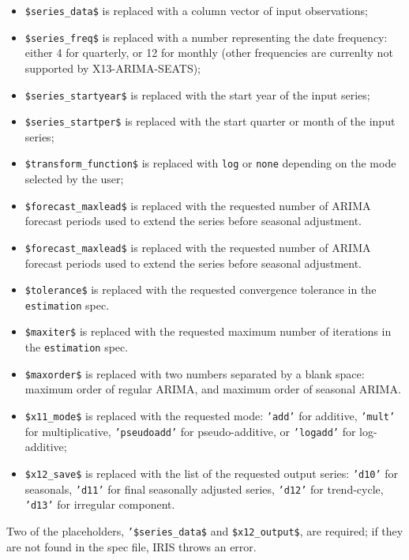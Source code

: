 \begin{itemize}
\itemsep1pt\parskip0pt
\item
  \texttt{\$series\_data\$} is replaced with a column vector of input
  observations;
\item
  \texttt{\$series\_freq\$} is replaced with a number representing the
  date frequency: either 4 for quarterly, or 12 for monthly (other
  frequencies are currenlty not supported by X13-ARIMA-SEATS);
\item
  \texttt{\$series\_startyear\$} is replaced with the start year of the
  input series;
\item
  \texttt{\$series\_startper\$} is replaced with the start quarter or
  month of the input series;
\item
  \texttt{\$transform\_function\$} is replaced with \texttt{log} or
  \texttt{none} depending on the mode selected by the user;
\item
  \texttt{\$forecast\_maxlead\$} is replaced with the requested number
  of ARIMA forecast periods used to extend the series before seasonal
  adjustment.
\item
  \texttt{\$forecast\_maxlead\$} is replaced with the requested number
  of ARIMA forecast periods used to extend the series before seasonal
  adjustment.
\item
  \texttt{\$tolerance\$} is replaced with the requested convergence
  tolerance in the \texttt{estimation} spec.
\item
  \texttt{\$maxiter\$} is replaced with the requested maximum number of
  iterations in the \texttt{estimation} spec.
\item
  \texttt{\$maxorder\$} is replaced with two numbers separated by a
  blank space: maximum order of regular ARIMA, and maximum order of
  seasonal ARIMA.
\item
  \texttt{\$x11\_mode\$} is replaced with the requested mode:
  \texttt{'add'} for additive, \texttt{'mult'} for multiplicative,
  \texttt{'pseudoadd'} for pseudo-additive, or \texttt{'logadd'} for
  log-additive;
\item
  \texttt{\$x12\_save\$} is replaced with the list of the requested
  output series: \texttt{'d10'} for seasonals, \texttt{'d11'} for final
  seasonally adjusted series, \texttt{'d12'} for trend-cycle,
  \texttt{'d13'} for irregular component.
\end{itemize}

Two of the placeholders, \texttt{'\$series\_data\$} and
\texttt{\$x12\_output\$}, are required; if they are not found in the
spec file, IRIS throws an error.

